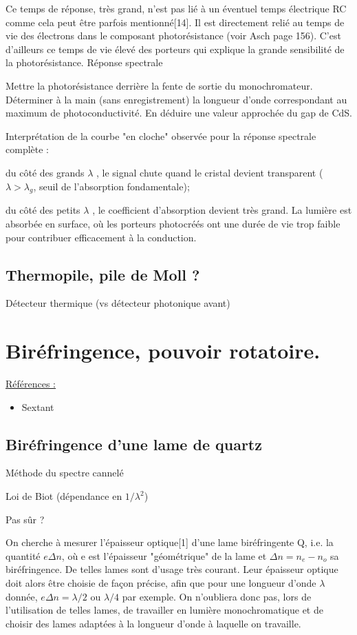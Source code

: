 \documentclass{article}%
\begin{document}
Ce temps de réponse, très grand, n'est pas lié à un éventuel temps électrique RC comme cela peut être parfois mentionné[14]. Il est directement relié au temps de vie des électrons dans le composant photorésistance (voir Asch page 156). C'est d'ailleurs ce temps de vie élevé des porteurs qui explique la grande sensibilité de la photorésistance.
Réponse spectrale

Mettre la photorésistance derrière la fente de sortie du monochromateur. Déterminer à la main (sans enregistrement) la longueur d'onde correspondant au maximum de photoconductivité. En déduire une valeur approchée du gap de CdS.

Interprétation de la courbe "en cloche" observée pour la réponse spectrale complète :

    du côté des grands $\lambda$ , le signal chute quand le cristal devient transparent ( $\lambda > \lambda _{g}$, seuil de l'absorption fondamentale);

    du côté des petits $\lambda$ , le coefficient d'absorption devient très grand. La lumière est absorbée en surface, où les porteurs photocréés ont une durée de vie trop faible pour contribuer efficacement à la conduction.

\subsection{Thermopile, pile de Moll ?}
Détecteur thermique (vs détecteur photonique avant)

\section{Biréfringence, pouvoir rotatoire.}
\underline{Références :}
\begin{itemize}
	\item Sextant
\end{itemize}


\subsection{Biréfringence d'une lame de quartz}
Méthode du spectre cannelé

Loi de Biot (dépendance en $1/\lambda^2$)

Pas sûr ?

On cherche à mesurer l'épaisseur optique[1] d'une lame biréfringente Q, i.e. la quantité $e \Delta n$, où e est l'épaisseur "géométrique" de la lame et $\Delta n = n_e - n_o$ sa biréfringence. De telles lames sont d'usage très courant. Leur épaisseur optique doit alors être choisie de façon précise, afin que pour une longueur d'onde $\lambda$ donnée, $e \Delta n = \lambda/2$ ou $\lambda/4$ par exemple. On n'oubliera donc pas, lors de l'utilisation de telles lames, de travailler en lumière monochromatique et de choisir des lames adaptées à la longueur d'onde à laquelle on travaille.
\end{document}
